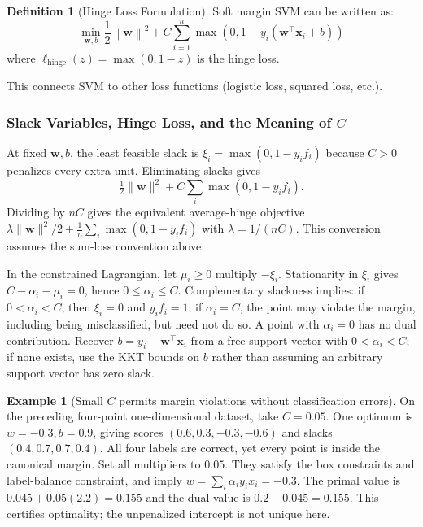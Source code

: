 \documentclass[11pt,twoside]{article}
\numberwithin{equation}{section}
\newcommand{\vect}[1]{\bm{#1}}
\newcommand{\norm}[1]{\left\lVert#1\right\rVert}
\theoremstyle{plain}
\theoremstyle{definition}
\newtheorem{definition}[theorem]{Definition}
\newtheorem{example}[theorem]{Example}
\theoremstyle{remark}
\begin{document}
\begin{definition}[Hinge Loss Formulation]
Soft margin SVM can be written as:
\[
\min_{\vect{w}, b} \frac{1}{2}\norm{\vect{w}}^2 + C\sum_{i=1}^n \max(0, 1 - y_i(\vect{w}^\top\vect{x}_i + b))
\]
where $\ell_{\text{hinge}}(z) = \max(0, 1-z)$ is the hinge loss.

This connects SVM to other loss functions (logistic loss, squared loss, etc.).
\end{definition}

\subsubsection{Slack Variables, Hinge Loss, and the Meaning of \texorpdfstring{$C$}{C}}
At fixed $\vect w,b$, the least feasible slack is $\xi_i=\max(0,1-y_if_i)$ because $C>0$ penalizes every extra unit. Eliminating slacks gives
\[
\tfrac12\|\vect w\|^2+C\sum_i\max(0,1-y_if_i).
\]
Dividing by $nC$ gives the equivalent average-hinge objective $\lambda\|\vect w\|^2/2+\frac1n\sum_i\max(0,1-y_if_i)$ with $\lambda=1/(nC)$. This conversion assumes the sum-loss convention above.

In the constrained Lagrangian, let $\mu_i\ge0$ multiply $-\xi_i$. Stationarity in $\xi_i$ gives $C-\alpha_i-\mu_i=0$, hence $0\le\alpha_i\le C$. Complementary slackness implies: if $0<\alpha_i<C$, then $\xi_i=0$ and $y_if_i=1$; if $\alpha_i=C$, the point may violate the margin, including being misclassified, but need not do so. A point with $\alpha_i=0$ has no dual contribution. Recover $b=y_i-\vect w^\top\vect x_i$ from a free support vector with $0<\alpha_i<C$; if none exists, use the KKT bounds on $b$ rather than assuming an arbitrary support vector has zero slack.

\begin{example}[Small $C$ permits margin violations without classification errors]
On the preceding four-point one-dimensional dataset, take $C=0.05$. One optimum is $w=-0.3,b=0.9$, giving scores $(0.6,0.3,-0.3,-0.6)$ and slacks $(0.4,0.7,0.7,0.4)$. All four labels are correct, yet every point is inside the canonical margin. Set all multipliers to $0.05$. They satisfy the box constraints and label-balance constraint, and imply $w=\sum_i\alpha_i y_ix_i=-0.3$. The primal value is $0.045+0.05(2.2)=0.155$ and the dual value is $0.2-0.045=0.155$. This certifies optimality; the unpenalized intercept is not unique here.
\end{example}
\end{document}
